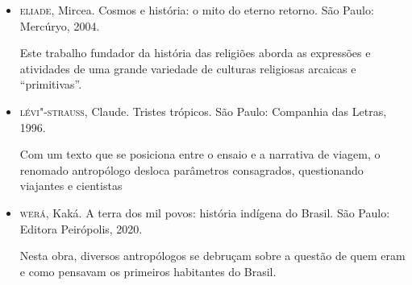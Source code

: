 \documentclass[12pt]{extarticle}
\begin{document}
\begin{itemize}
\item\textsc{eliade}, Mircea. Cosmos e história: o mito do eterno retorno. São Paulo: Mercúryo, 2004.

Este trabalho fundador da história das religiões aborda as expressões e
atividades de uma grande variedade de culturas religiosas arcaicas e
``primitivas''.

\item\textsc{lévi"-strauss}, Claude. Tristes trópicos. São Paulo: Companhia das Letras, 1996.

Com um texto que se posiciona entre o ensaio e a narrativa de viagem, o
renomado antropólogo desloca parâmetros consagrados, questionando
viajantes e cientistas

\item\textsc{werá}, Kaká. A terra dos mil povos: história indígena do Brasil. São
Paulo: Editora Peirópolis, 2020.

Nesta obra, diversos antropólogos se debruçam sobre a questão de quem
eram e como pensavam os primeiros habitantes do Brasil.
\end{itemize}
\end{document}
